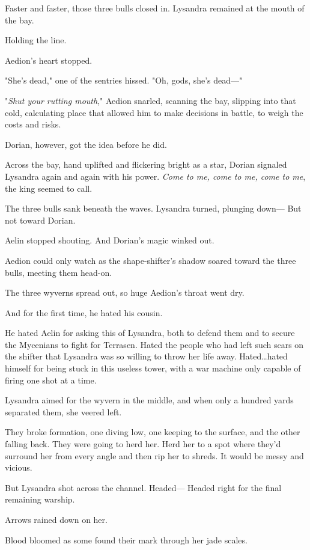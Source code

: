 Faster and faster, those three bulls closed in.
Lysandra remained at the mouth of the bay.

Holding the line.

Aedion's heart stopped.

"She's dead," one of the sentries hissed.
"Oh, gods, she's dead---"

"\emph{Shut your rutting mouth}," Aedion snarled, scanning the bay, slipping into that cold, calculating place that allowed him to make decisions in battle, to weigh the costs and risks.

Dorian, however, got the idea before he did.

Across the bay, hand uplifted and flickering bright as a star, Dorian signaled Lysandra again and again with his power.
\emph{Come to me, come to me, come to me}, the king seemed to call.

The three bulls sank beneath the waves.
Lysandra turned, plunging down--- But not toward Dorian.

Aelin stopped shouting.
And Dorian's magic winked out.

Aedion could only watch as the shape-shifter's shadow soared toward the three bulls, meeting them head-on.

The three wyverns spread out, so huge Aedion's throat went dry.

And for the first time, he hated his cousin.

He hated Aelin for asking this of Lysandra, both to defend them and to secure the Mycenians to fight for Terrasen.
Hated the people who had left such scars on the shifter that Lysandra was so willing to throw her life away.
Hated\ldots hated himself for being stuck in this useless tower, with a war machine only capable of firing one shot at a time.

Lysandra aimed for the wyvern in the middle, and when only a hundred yards separated them, she veered left.

They broke formation, one diving low, one keeping to the surface, and the other falling back.
They were going to herd her.
Herd her to a spot where they'd surround her from every angle and then rip her to shreds.
It would be messy and vicious.

But Lysandra shot across the channel.
Headed--- Headed right for the final remaining warship.

Arrows rained down on her.

Blood bloomed as some found their mark through her jade scales.


